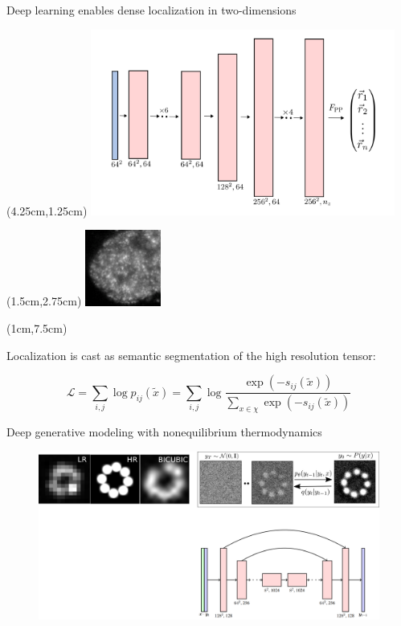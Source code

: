 \documentclass{beamer}					%
\begin{document}
\begin{frame}{Deep learning enables dense localization in two-dimensions}
\begin{textblock*}{10cm}(4.25cm,1.25cm)
\includegraphics[width=10cm]{DeepSTORM.png}
\end{textblock*}
\begin{textblock*}{2.5cm}(1.5cm,2.75cm)
\includegraphics[width=2.5cm]{Laser-Crop.png}
\end{textblock*}

\begin{textblock*}{\textwidth}(1cm,7.5cm)

Localization is cast as semantic segmentation of the high resolution tensor:

\begin{equation*}
\mathcal{L} = \sum_{i,j} \log p_{ij}(\tilde{x}) = \sum_{i,j} \log \frac{\exp(-s_{ij}(\tilde{x}))}{\sum_{x\in\chi} \exp(-s_{ij}(\tilde{x}))}
\end{equation*}

\end{textblock*}

\end{frame}

\begin{frame}{Deep generative modeling with nonequilibrium thermodynamics}
\begin{figure}
\includegraphics[width=12cm]{Diffusion.png}
\end{figure}
\end{frame}
\end{document}
